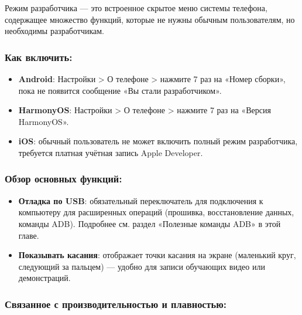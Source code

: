 


Режим разработчика — это встроенное скрытое меню системы телефона, содержащее множество функций, которые не нужны обычным пользователям, но необходимы разработчикам.

\subsubsection*{Как включить:}

\begin{itemize}
  \item \textbf{Android}: Настройки > О телефоне > нажмите 7 раз на «Номер сборки», пока не появится сообщение «Вы стали разработчиком».
  \item \textbf{HarmonyOS}: Настройки > О телефоне > нажмите 7 раз на «Версия HarmonyOS».
  \item \textbf{iOS}: обычный пользователь не может включить полный режим разработчика, требуется платная учётная запись Apple Developer.
\end{itemize}

\subsubsection*{Обзор основных функций:}

\begin{itemize}
  \item \textbf{Отладка по USB}: обязательный переключатель для подключения к компьютеру для расширенных операций (прошивка, восстановление данных, команды ADB). Подробнее см. раздел «Полезные команды ADB» в этой главе.
  \item \textbf{Показывать касания}: отображает точки касания на экране (маленький круг, следующий за пальцем) — удобно для записи обучающих видео или демонстраций.
\end{itemize}

\subsubsection*{Связанное с производительностью и плавностью:}

